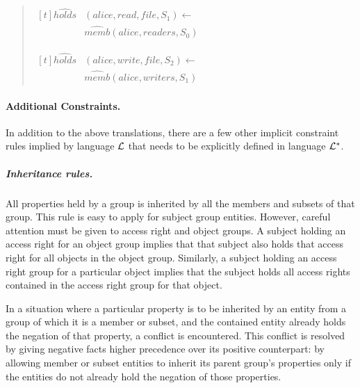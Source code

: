 \documentclass[10pt, twocolumn]{article}
\begin{document}
          \begin{quote}
            \begin{math}
              \begin{aligned}[t]
                \hat{holds}&(alice, read, file, S_{1}) \leftarrow \\
                & \hat{memb}(alice, readers, S_{0})
              \end{aligned}
            \end{math}

            \begin{math}
              \begin{aligned}[t]
                \hat{holds}&(alice, write, file, S_{2}) \leftarrow \\
                & \hat{memb}(alice, writers, S_{1})
              \end{aligned}
            \end{math}
          \end{quote}

        \paragraph{Additional Constraints.}

          In addition to the above translations, there are a few other implicit
          constraint rules implied by language ${\cal L}$ that needs to be
          explicitly defined in language ${\cal L}^{*}$.

          \subparagraph{Inheritance rules.}

            All properties held by a group is inherited by all the members and
            subsets of that group. This rule is easy to apply for subject group
            entities. However, careful attention must be given to access right
            and object groups. A subject holding an access right for an object
            group implies that that subject also holds that access right for
            all objects in the object group. Similarly, a subject holding an
            access right group for a particular object implies that the subject
            holds all access rights contained in the access right group for
            that object.

            In a situation where a particular property is to be inherited by
            an entity from a group of which it is a member or subset, and the
            contained entity already holds the negation of that property, a
            conflict is encountered. This conflict is resolved by giving
            negative facts higher precedence over its positive counterpart:
            by allowing member or subset entities to inherit its parent group's
            properties only if the entities do not already hold the negation of
            those properties.
\end{document}
